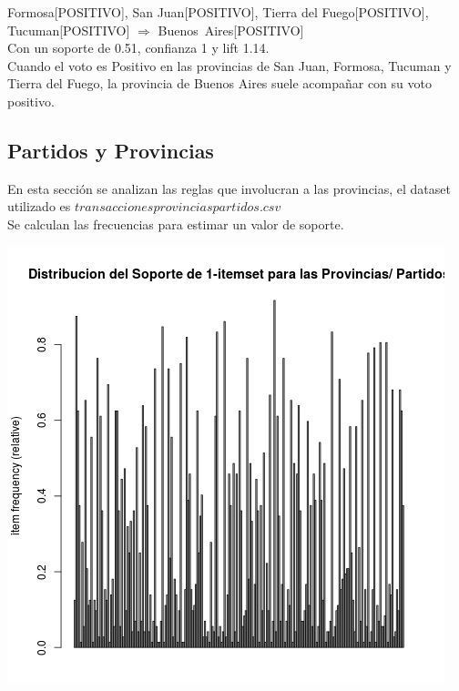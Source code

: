 \documentclass{endm}
\begin{document}
{Formosa[POSITIVO],                             San Juan[POSITIVO],                             Tierra del Fuego[POSITIVO],                     Tucuman[POSITIVO]} $\Longrightarrow$ {Buenos\ Aires[POSITIVO]} \\

Con un soporte de 0.51, confianza 1 y lift 1.14. \\

Cuando el voto es Positivo en las provincias de San Juan, Formosa, Tucuman y Tierra del Fuego, la provincia de Buenos Aires suele acompañar con su voto positivo. \\


\subsection{Partidos y Provincias}

En esta sección se analizan las reglas que involucran a las provincias, el dataset utilizado es $transaccionesprovinciaspartidos.csv$ \\

Se calculan las frecuencias para estimar un valor de soporte. \\

\begin{center}
\includegraphics[scale=0.4]{graficos/soportesProvinciasPartidos.png}
\end{center}
\end{document}
